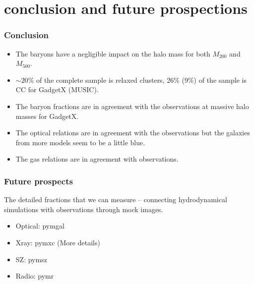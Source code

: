 \documentclass[aspectratio=1610]{beamer}
\begin{document}
\section{conclusion and future prospections}
\begin{frame}
  \frametitle{Conclusion}
  {\Large
  \begin{itemize}
    \item The baryons have a negligible impact on the halo mass for both $M_{200}$ and $M_{500}$.
    \item $\sim 20 \%$ of the complete sample is relaxed clusters, 26\% (9\%) of the sample is CC for GadgetX (MUSIC).
    \item The baryon fractions are in agreement with the observations at massive halo masses for GadgetX.
    \item The optical relations are in agreement with the observations but the galaxies from more models seem to be a little blue.
    \item The gas relations are in agreement with observations.
  \end{itemize}}
\end{frame}

\begin{frame}
  \frametitle{Future prospects}
  The detailed fractions that we can measure -- connecting hydrodynamical simulations with observations through mock images.
  \begin{itemize}
    \item Optical: pymgal
    \item Xray: pymxc  (More details)
    \item SZ: pymsz
    \item Radio: pymr
  \end{itemize}

\end{frame}
\end{document}

